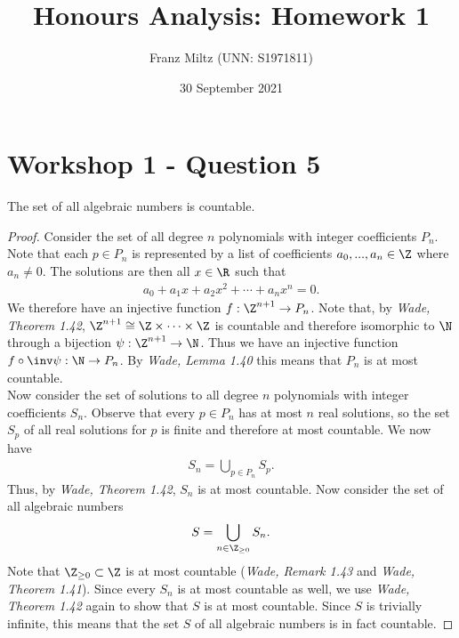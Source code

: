 \documentclass{article}
\begin{document}
\title{Honours Analysis: Homework 1}
\author{Franz Miltz (UNN: S1971811)}
\date{30 September 2021}
\maketitle

\section{Workshop 1 - Question 5}

\begin{claim}
   The set of all algebraic numbers is countable.
   \begin{proof}
      Consider the set of all degree $n$ polynomials with integer coefficients $P_n$.
      Note that each $p\in P_n$ is represented by a list of coefficients
      $a_0, ..., a_n\in\Z$ where $a_n\not=0$. The solutions are then all $x\in\R$
      such that
      \begin{align*}
         a_0 + a_1 x + a_2 x^2 + \cdots + a_n x^n = 0.
      \end{align*}
      We therefore have an injective function $f:\Z^{n+1}\to P_n$.
      Note that, by \emph{Wade, Theorem 1.42}, $\Z^{n+1}\cong \Z \times \cdots \times \Z$ is countable and therefore isomorphic to $\N$
      through a bijection $\psi:\Z^{n+1}\to\N$. Thus we have an injective
      function $f\circ\inv\psi:\N\to P_n$.
      By \emph{Wade, Lemma 1.40} this means that $P_n$ is at most countable.\\
      Now consider the set of solutions to all degree $n$ polynomials with
      integer coefficients $S_n$. Observe that every $p\in P_n$ has at most
      $n$ real solutions, so the set $S_p$ of all real solutions for $p$ is
      finite and therefore at most countable.
      We now have
      \begin{align*}
         S_n = \bigcup_{p\in P_n} S_p.
      \end{align*}
      Thus, by \emph{Wade, Theorem 1.42}, $S_n$ is at most countable.
      Now consider the set of all algebraic numbers
      \begin{align*}
         S = \bigcup_{n\in\Z_{\geq 0}}S_n.
      \end{align*}
      Note that $\Z_{\geq 0}\subset \Z$ is at most countable
      (\emph{Wade, Remark 1.43} and \emph{Wade, Theorem 1.41}). Since
      every $S_n$ is at most countable as well, we use \emph{Wade, Theorem 1.42}
      again to show that $S$ is at most countable.
      Since $S$ is trivially infinite, this means that the set $S$ of
      all algebraic numbers is in fact countable.
   \end{proof}
\end{claim}
\end{document}
